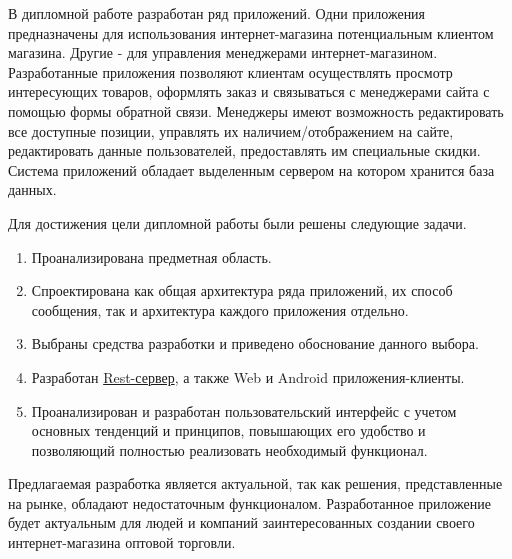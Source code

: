 \indent

В дипломной работе разработан ряд приложений.
Одни приложения предназначены для использования интернет-магазина потенциальным клиентом магазина.
Другие -  для управления менеджерами интернет-магазином.
Разработанные приложения позволяют клиентам осуществлять просмотр интересующих товаров, оформлять заказ и связываться с менеджерами сайта с помощью формы обратной связи.
Менеджеры имеют возможность редактировать все доступные позиции, управлять их наличием/отображением на сайте, редактировать данные пользователей, предоставлять им специальные скидки.
Система приложений обладает выделенным сервером на котором хранится база данных.

Для достижения цели дипломной работы были решены следующие задачи.
\begin{enumerate}
    \item Проанализирована предметная область.
    \item Спроектирована как общая архитектура ряда приложений, их способ сообщения, так и архитектура каждого приложения отдельно.
    \item Выбраны средства разработки и приведено обоснование данного выбора.
    \item Разработан \hyperlink{gloss:rest}{Rest-сервер}, а также Web и Android приложения-клиенты.
    \item Проанализирован и разработан пользовательский интерфейс с учетом основных тенденций и принципов, повышающих его удобство и позволяющий полностью реализовать необходимый функционал.
\end{enumerate}

Предлагаемая разработка является актуальной, так как решения, представленные на рынке, обладают недостаточным функционалом.
Разработанное приложение будет актуальным для людей и компаний заинтересованных создании своего интернет-магазина оптовой торговли.
